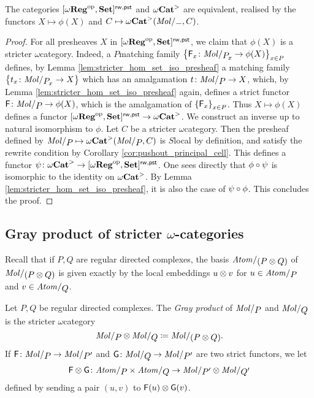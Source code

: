 \begin{prop} \label{prop:stricter_cat_are_local_presheaves}
    The categories \( [\omega\mathbf{Reg}^\mathrm{op}, \mathbf{Set}]^{\mathsf{rw, pst}} \) and \( {\omega\mathbf{Cat}}^> \) are equivalent, realised by the functors \( X \mapsto \phi(X) \) and \( C \mapsto \somegaCat(\molecin{-}, C) \). 
\end{prop}
\begin{proof}
    For all presheaves \( X \) in \( [\omega\mathbf{Reg}^\mathrm{op}, \mathbf{Set}]^{\mathsf{rw, pst}} \), we claim that \( \phi(X) \) is a stricter \( \omega \)\nbd category.
    Indeed, a \( P \)\nbd matching family \( \set{\F_x \colon \molecin{\imel{P}{x}} \to \phi(X)}_{x \in P} \) defines, by Lemma \ref{lem:stricter_hom_set_iso_presheaf} a matching family \( \set{t_x \colon \molecin{\imel{P}{x}} \to X} \) which has an amalgamation \( t \colon \molecin{P} \to X \), which, by Lemma \ref{lem:stricter_hom_set_iso_presheaf} again, defines a strict functor \( \F \colon \molecin{P} \to \phi(X) \), which is the amalgamation of \( \left\{ {\mathsf{F}_x} \right\}_{x \in P} \). 
    Thus \( X \mapsto \phi(X) \) defines a functor \( [\omega\mathbf{Reg}^\mathrm{op}, \mathbf{Set}]^{\mathsf{rw, pst}} \to {\omega\mathbf{Cat}}^> \).
    We construct an inverse up to natural isomorphism to \( \phi \).
    Let \( C \) be a stricter \( \omega \)\nbd category.
    Then the presheaf defined by \(\molecin{P} \mapsto \somegaCat(\molecin{P}, C) \) is \( S \)\nbd local by definition, and satisfy the rewrite condition by Corollary \ref{cor:pushout_principal_cell}.
    This defines a functor \( \psi \colon {\omega\mathbf{Cat}}^> \to [\omega\mathbf{Reg}^\mathrm{op}, \mathbf{Set}]^{\mathsf{rw, pst}} \).
    One sees directly that \( \phi \circ \psi \) is isomorphic to the identity on \( {\omega\mathbf{Cat}}^> \). 
    By Lemma \ref{lem:stricter_hom_set_iso_presheaf}, it is also the case of \( \psi \circ \phi \).
    This concludes the proof.
\end{proof}

\subsection{Gray product of stricter \texorpdfstring{$\omega$}{ω}-categories}

Recall that if \( P, Q \) are regular directed complexes, the basis \( \atomin{(P \gray Q)} \) of \( \molecin{(P \gray Q)} \) is given exactly by the local embeddings \( u \otimes v \) for \( u \in \atomin{P} \) and \( v \in \atomin{Q} \).  

\begin{dfn}  \label{dfn:gray_product_of_stricter_regular_complexes}
    Let \( P, Q \) be regular directed complexes.
    The \emph{Gray product} of \( \molecin{P} \) and \( \molecin{Q} \) is the stricter \( \omega \)\nbd category
    \begin{equation*}
        \molecin{P} \gray \molecin{Q} \eqdef \molecin{(P \gray Q)}.
    \end{equation*}
    If \( \F \colon \molecin{P} \to \molecin{P'} \) and \( \G \colon \molecin{Q} \to \molecin{P'} \) are two strict functors, we let 
    \begin{equation*}
        \F \gray \G \colon \atomin{P} \times \atomin{Q} \to  \molecin{P'} \gray \molecin{Q'}
    \end{equation*}
    defined by sending a pair \( (u, v) \) to \( \mathsf{F}(u) \otimes \mathsf{G}(v) \).
\end{dfn}

